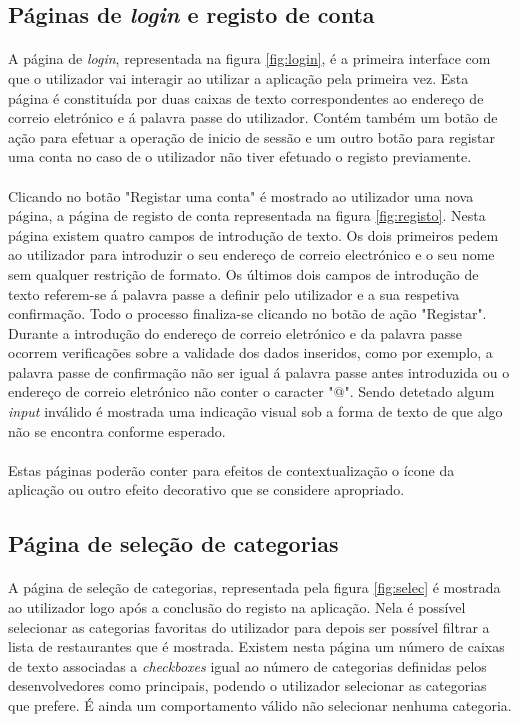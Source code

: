 \documentclass[a4paper,12pt]{scrreprt}
\begin{document}
\subsection{Páginas de \textit{login} e registo de conta}
\paragraph{}
A página de \textit{login}, representada na figura  \ref{fig:login}, é a primeira interface com que o utilizador vai interagir ao utilizar a aplicação pela primeira vez. Esta página é constituída por duas caixas de texto correspondentes ao endereço de correio eletrónico e á palavra passe do utilizador.
Contém também um botão de ação para efetuar a operação de inicio de sessão e um outro botão para registar uma conta no caso de o utilizador não tiver efetuado o registo previamente.
\paragraph{}
Clicando no botão "Registar uma conta" é mostrado ao utilizador uma nova página, a página de registo de conta representada na figura \ref{fig:registo}.
Nesta página existem quatro campos de introdução de texto. Os dois primeiros pedem ao utilizador para introduzir o seu endereço de correio electrónico e o seu nome sem qualquer restrição de formato.
Os últimos dois campos de introdução de texto referem-se á palavra passe a definir pelo utilizador e a sua respetiva confirmação.
Todo o processo finaliza-se clicando no botão de ação "Registar". 
Durante a introdução do endereço de correio eletrónico e da palavra passe ocorrem verificações sobre a validade dos dados inseridos, como por exemplo, a palavra passe de confirmação não ser igual á palavra passe antes introduzida ou o endereço de correio eletrónico não conter o caracter "@". Sendo detetado algum \textit{input} inválido é mostrada uma indicação visual sob a forma de texto de que algo não se encontra conforme esperado.
\paragraph{}
Estas páginas poderão conter para efeitos de contextualização o ícone da aplicação ou outro efeito decorativo que se considere apropriado.
\subsection{Página de seleção de categorias}
\paragraph{}
A página de seleção de categorias, representada pela figura \ref{fig:selec} é mostrada ao utilizador logo após a conclusão do registo na aplicação. Nela é possível selecionar as categorias favoritas do utilizador para depois ser possível filtrar a lista de restaurantes que é mostrada. Existem nesta página um número de caixas de texto associadas a \textit{checkboxes} igual ao número de categorias definidas pelos desenvolvedores como principais, podendo o utilizador selecionar as categorias que prefere. É ainda um comportamento válido não selecionar nenhuma categoria.
\end{document}
